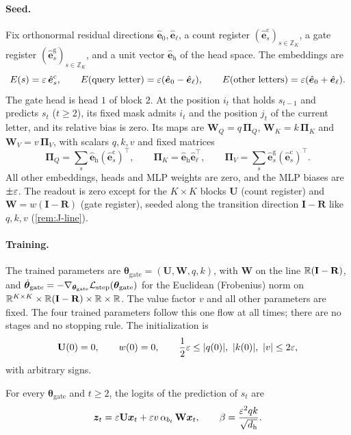 \paragraph{Seed.} Fix orthonormal residual directions $\hat{\bm e}_0,\hat{\bm e}_\ell$, a count register $(\hat{\bm e}^{\mathrm c}_s)_{s\in\mathbb Z_K}$, a gate register
$(\hat{\bm e}^{\mathrm g}_s)_{s\in\mathbb Z_K}$, and a unit vector $\hat{\bm e}_{\mathrm h}$ of the head space. The embeddings are
\[
 E(s)=\varepsilon\,\hat{\bm e}^{\mathrm c}_s,\qquad E(\text{query letter})=\varepsilon(\hat{\bm e}_0-\hat{\bm e}_\ell),\qquad E(\text{other letters})=\varepsilon(\hat{\bm e}_0+\hat{\bm e}_\ell).
\]
The gate head is head $1$ of block $2$. At the position $i_t$ that holds $s_{t-1}$ and predicts $s_t$ ($t\ge2$), its fixed mask admits
$i_t$ and the position $j_t$ of the current letter, and its relative bias is zero. Its maps are $\mathbf W_Q=q\,\bm\Pi_Q$, $\mathbf W_K=k\,\bm\Pi_K$ and
$\mathbf W_V=v\,\bm\Pi_V$, with scalars $q,k,v$ and fixed matrices
\[
 \bm\Pi_Q=\textstyle\sum_s\hat{\bm e}_{\mathrm h}(\hat{\bm e}^{\mathrm c}_s)^{\!\top},\qquad \bm\Pi_K=\hat{\bm e}_{\mathrm h}\hat{\bm e}_\ell^{\top},\qquad \bm\Pi_V=\sum_s\hat{\bm e}^{\mathrm g}_s(\hat{\bm e}^{\mathrm c}_s)^{\!\top}.
\]
All other embeddings, heads and MLP weights are zero, and the MLP biases are $\pm\varepsilon$. The readout is zero except for the
$K\times K$ blocks $\mathbf U$ (count register) and $\mathbf W=w(\mathbf I-\mathbf R)$ (gate register), seeded along the transition direction
$\mathbf I-\mathbf R$ like $q,k,v$ (\cref{rem:J-line}).

\paragraph{Training.} The trained parameters are $\bm\theta_{\mathrm{gate}}=(\mathbf U,\mathbf W,q,k)$, with $\mathbf W$ on the line $\mathbb R(\mathbf I-\mathbf R)$, and
$\dot{\bm\theta}_{\mathrm{gate}}=-\nabla_{\bm\theta_{\mathrm{gate}}}\mathcal L_{\mathrm{step}}(\bm\theta_{\mathrm{gate}})$ for the Euclidean (Frobenius) norm on $\mathbb R^{K\times K}\times\mathbb R(\mathbf I-\mathbf R)\times\mathbb R\times\mathbb R$. The value factor $v$
and all other parameters are fixed. The four trained parameters follow this one flow at all times; there are no stages and no stopping
rule. The initialization is
\[
 \mathbf U(0)=0,\qquad w(0)=0,\qquad \tfrac{1}{2}\initscale\le|q(0)|,\ |k(0)|,\ |v|\le2\initscale,
\]
with arbitrary signs.

\begin{lemma}
\label{lem:J-features}
For every $\bm\theta_{\mathrm{gate}}$ and $t\ge2$, the logits of the prediction of $s_t$ are
\[
 \bm z_t=\varepsilon \mathbf U\bm x_t+\varepsilon v\,\alpha_{b_t}\,\mathbf W\bm x_t,\qquad \beta=\frac{\varepsilon^2qk}{\sqrt{d_{\mathrm h}}}.
\]
\end{lemma}

